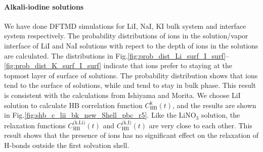 \paragraph{Alkali-iodine solutions}
% 
We have done DFTMD simulations for LiI, NaI, KI bulk system and interface system respectively.
The probability distributions of ions in the solution/vapor interface of LiI and NaI solutions with repect to the depth 
of ions in the solutions %
are calculated. 
The distributions in Fig.\thinspace\ref{fig:prob_dist_Li_surf_I_surf}--\ref{fig:prob_dist_K_surf_I_surf} indicate
that \I ions prefer to staying at the topmost layer of surface of solutions.
The probability distribution shows that \I ions tend to the surface of solutions, while \Na and \Li tend to stay in bulk phase. 
This result is consistent with the calculations from Ishiyama and Morita\cite{TI07,Ishiyama2014}.
We choose LiI solution to calculate HB correlation function $C^\text{k}_\text{HB}(t)$,
and the results are shown in Fig.\ref{fig:shb_c_lii_bk_new_Shell_pbc_r5}. 
Like the LiNO$_3$ solution, the relaxation functions $C^\text{(k,Li)}_\text{HB}(t)$ and 
$C^\text{(k,I)}_\text{HB}(t)$ are very close to each other. 
This result shows that the presence of ions has no significant effect on the relaxation of H-bonds outside the first solvation shell.

